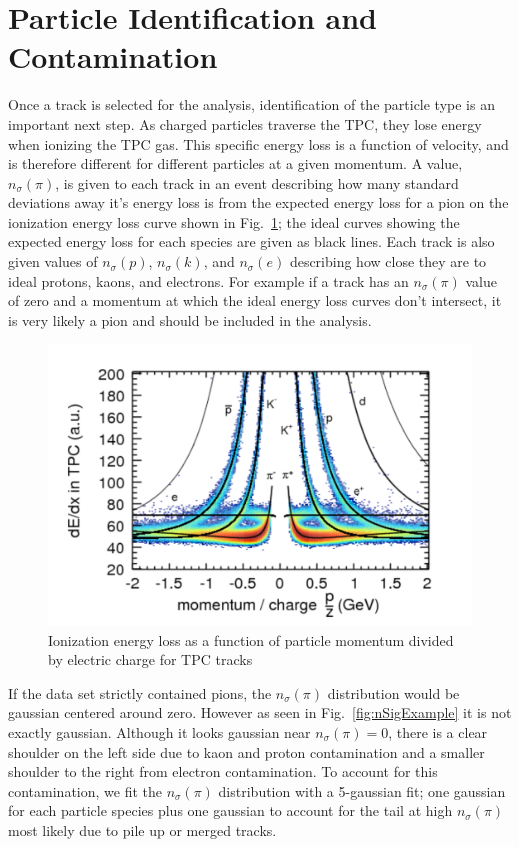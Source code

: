 \documentclass[letterpaper, abstract = on,listof=totoc, bibliography=totoc]{scrreprt}
\begin{document}
\section{Particle Identification and Contamination}

Once a track is selected for the analysis, identification of the particle type is an important next step. As charged particles traverse the TPC, they lose energy when ionizing the TPC gas. This specific energy loss is a function of velocity, and is therefore different for different particles at a given momentum. A value, $n_\sigma(\pi)$, is given to each track in an event describing how many standard deviations away it's energy loss is from the expected energy loss for a pion on the ionization energy loss curve shown in Fig.~\ref{fig:tpcDedx2}; the ideal curves showing the expected energy loss for each species are given as black lines. Each track is also given values of $n_\sigma(p)$, $n_\sigma(k)$, and $n_\sigma(e)$ describing how close they are to ideal protons, kaons, and electrons. For example if a track has an $n_\sigma(\pi)$ value of zero and a momentum at which the ideal energy loss curves don't intersect, it is very likely a pion and should be included in the analysis. 

 \begin{figure}
\begin{center}
\includegraphics[width = .8\textwidth]{TPC_dedx2}
\caption[Ionization energy loss in TPC]{Ionization energy loss as a function of particle momentum divided by electric charge for TPC tracks}
\label{fig:tpcDedx2}
\end{center}
\end{figure}


If the data set strictly contained pions, the $n_\sigma(\pi)$ distribution would be gaussian centered around zero. However as seen in Fig.~\ref{fig:nSigExample} it is not exactly gaussian. Although it looks gaussian near $n_\sigma(\pi) = 0$, there is a clear shoulder on the left side due to kaon and proton contamination and a smaller shoulder to the right from electron contamination. To account for this contamination, we fit the $n_\sigma(\pi)$ distribution with a 5-gaussian fit; one gaussian for each particle species plus one gaussian to account for the tail at high $n_\sigma(\pi)$ most likely due to pile up or merged tracks. 
\end{document}

